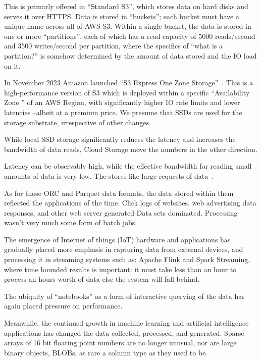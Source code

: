 \documentclass[manuscript]{acmart}
\begin{document}
This is primarly offered in ``Standard S3'', which stores data
on hard disks and serves it over HTTPS\@.
Data is stored in ``buckets''; each bucket must have a
unique name across all of AWS S3. Within a single bucket, the data is stored in one or more
``partitions'', each of which has a read capacity of 5000 reads/second and 3500 writes/second per
partition, where the specifics of ``what is a partition?'' is somehow determined by the amount of
data stored and the IO load on it.

In November 2023 Amazon launched ``S3 Express One Zone Storage''\ \cite{2023-s3express}.
This is a high-performance version of S3 which is deployed within a specific ``Availability Zone
'' of an AWS Region, with significantly higher IO rate limits and lower latencies --albeit at a
premium price.
We presume that SSDs are used for the storage substrate, irrespective of other changes.

While local SSD storage significantly reduces the latency and increases the bandwidth of data
reads, Cloud Storage move the numbers in the other direction.

Latency can be observably high,  while the effective bandwidth for reading small amounts of data is very low.
The stores like large requests of data\ \cite{aws:s3-performance}.



As for those ORC and Parquet data formats, the data stored within them reflected the applications of the time.
Click logs of websites, web advertising data responses, and other web server generated Data sets dominated.
Processing wasn't very much some form of batch jobs.

The emergence of Internet of things (IoT) hardware and applications has gradually placed more emphasis in capturing data from external devices, and processing it in streaming systems such as: Apache Flink and Spark Streaming, where time bounded results is important: it must take less than an hour to process an hours worth of data else the system will fall behind.

The ubiquity of ``notebooks'' as a form of interactive querying of the data has again placed pressure on performance.

Meanwhile, the continued growth in machine learning and artificial intelligence applications has changed the data collected, processed, and generated. Sparse arrays of 16 bit floating point numbers are no longer unusual,
nor are large binary objects, BLOBs, as rare a column type as they used to be.
\end{document}

